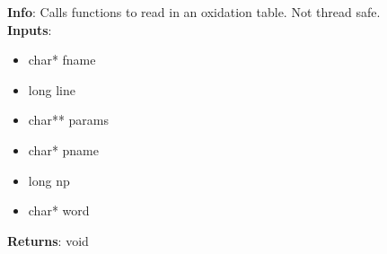 \textbf{Info}: Calls functions to read in an oxidation table. Not thread safe.\\

\noindent \textbf{Inputs}:
\begin{itemize}
\item{char* fname}
\item{long line}
\item{char** params}
\item{char* pname}
\item{long np}
\item{char* word}
\end{itemize}

\noindent \textbf{Returns}: void
